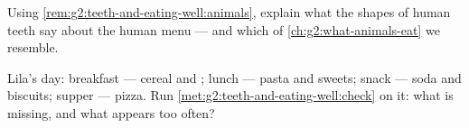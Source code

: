 \begin{exercise}[$\star\star$]\label{exo:g2:teeth-and-eating-well:9}
Using \cref{rem:g2:teeth-and-eating-well:animals}, explain what
the shapes of human teeth say about the human menu --- and which
 of \cref{ch:g2:what-animals-eat} we resemble.
\end{exercise}

\begin{exercise}[$\star\star$]\label{exo:g2:teeth-and-eating-well:10}
Lila's day: breakfast --- cereal and ; lunch --- pasta and
sweets; snack --- soda and biscuits; supper --- pizza. Run
\cref{met:g2:teeth-and-eating-well:check} on it: what is missing,
and what appears too often?
\end{exercise}
